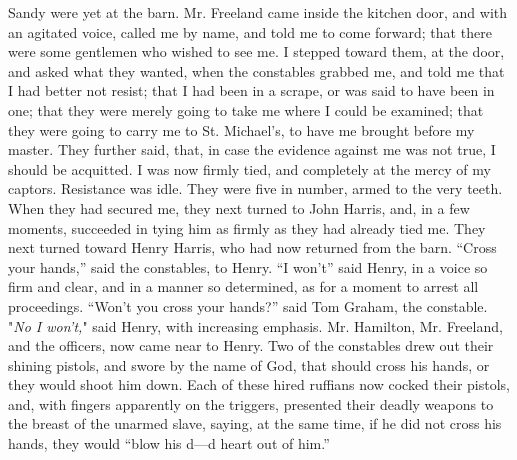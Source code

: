 Sandy were yet at the barn. {\protect\hypertarget{292}{}{}}Mr. Freeland
came inside the kitchen door, and with an agitated voice, called me by
name, and told me to come forward; that there were some gentlemen who
wished to see me. I stepped toward them, at the door, and asked what
they wanted, when the constables grabbed me, and told me that I had
better not resist; that I had been in a scrape, or was said to have been
in one; that they were merely going to take me where I could be
examined; that they were going to carry me to St. Michael's, to have me
brought before my master. They further said, that, in case the evidence
against me was not true, I should be acquitted. I was now firmly tied,
and completely at the mercy of my captors. Resistance was idle. They
were five in number, armed to the very teeth. When they had secured me,
they next turned to John Harris, and, in a few moments, succeeded in
tying him as firmly as they had already tied me. They next turned toward
Henry Harris, who had now returned from the barn. ``Cross your hands,''
said the constables, to Henry. ``I won't'' said Henry, in a voice so
firm and clear, and in a manner so determined, as for a moment to arrest
all proceedings. ``Won't you cross your hands?'' said Tom Graham, the
constable. "\emph{No I won't,}" said Henry, with increasing emphasis.
Mr. Hamilton, Mr. Freeland, and the officers, now came near to Henry.
Two of the constables drew out their shining pistols, and swore by the
name of God, that should cross his hands, or they would shoot him down.
Each of these hired ruffians now cocked their pistols, and, with fingers
apparently on the triggers, presented their deadly weapons to the breast
of the unarmed {\protect\hypertarget{293}{}{}}slave, saying, at the same
time, if he did not cross his hands, they would ``blow his d---d heart
out of him.''

